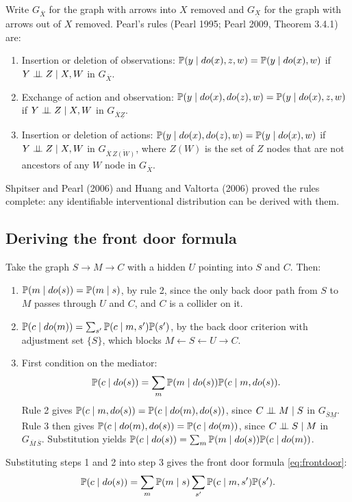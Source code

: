 Write $G_{\overline{X}}$ for the graph with arrows into $X$ removed and $G_{\underline{X}}$ for the graph with arrows out of $X$ removed. Pearl's rules (Pearl 1995; Pearl 2009, Theorem 3.4.1) are:
\begin{enumerate}
\item Insertion or deletion of observations: $\mathbb{P}(y \mid do(x), z, w) = \mathbb{P}(y \mid do(x), w)$ if $Y \perp\!\!\!\perp Z \mid X, W$ in $G_{\overline{X}}$.
\item Exchange of action and observation: $\mathbb{P}(y \mid do(x), do(z), w) = \mathbb{P}(y \mid do(x), z, w)$ if $Y \perp\!\!\!\perp Z \mid X, W$ in $G_{\overline{X}\underline{Z}}$.
\item Insertion or deletion of actions: $\mathbb{P}(y \mid do(x), do(z), w) = \mathbb{P}(y \mid do(x), w)$ if $Y \perp\!\!\!\perp Z \mid X, W$ in $G_{\overline{X}\,\overline{Z(W)}}$, where $Z(W)$ is the set of $Z$ nodes that are not ancestors of any $W$ node in $G_{\overline{X}}$.
\end{enumerate}
Shpitser and Pearl (2006) and Huang and Valtorta (2006) proved the rules complete: any identifiable interventional distribution can be derived with them.

\subsection{Deriving the front door formula}

Take the graph $S \to M \to C$ with a hidden $U$ pointing into $S$ and $C$. Then:
\begin{enumerate}
\item $\mathbb{P}(m \mid do(s)) = \mathbb{P}(m \mid s)$, by rule 2, since the only back door path from $S$ to $M$ passes through $U$ and $C$, and $C$ is a collider on it.
\item $\mathbb{P}(c \mid do(m)) = \sum_{s'}\mathbb{P}(c \mid m, s')\mathbb{P}(s')$, by the back door criterion with adjustment set $\{S\}$, which blocks $M \leftarrow S \leftarrow U \to C$.
\item First condition on the mediator:
\[
\mathbb{P}(c \mid do(s)) = \sum_m \mathbb{P}(m \mid do(s))\mathbb{P}(c \mid m, do(s)).
\]
Rule 2 gives $\mathbb{P}(c \mid m, do(s)) = \mathbb{P}(c \mid do(m), do(s))$, since $C \perp\!\!\!\perp M \mid S$ in $G_{\overline{S}\underline{M}}$. Rule 3 then gives $\mathbb{P}(c \mid do(m), do(s)) = \mathbb{P}(c \mid do(m))$, since $C \perp\!\!\!\perp S \mid M$ in $G_{\overline{M}\,\overline{S}}$. Substitution yields $\mathbb{P}(c \mid do(s)) = \sum_m \mathbb{P}(m \mid do(s))\mathbb{P}(c \mid do(m))$.
\end{enumerate}
Substituting steps 1 and 2 into step 3 gives the front door formula \eqref{eq:frontdoor}:
\[
\mathbb{P}(c \mid do(s)) = \sum_m \mathbb{P}(m \mid s)\sum_{s'}\mathbb{P}(c \mid m, s')\mathbb{P}(s').
\]

